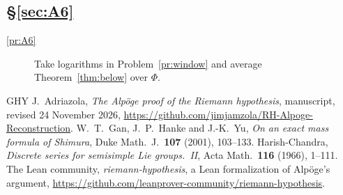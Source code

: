 \documentclass[reqno]{amsart}
\theoremstyle{definition}
\theoremstyle{plain}
\theoremstyle{remark}
\begin{document}
\subsection*{\S\ref{sec:A6}}
\begin{description}
\item[\ref{pr:A6}] Take logarithms in Problem~\ref{pr:window} and average
Theorem~\ref{thm:below} over $\Phi$.
\end{description}

\begin{thebibliography}{GHY}
J.~Adriazola, \emph{The Alp\"oge proof of the Riemann hypothesis}, manuscript, revised 24 November 2026, \url{https://github.com/jimjamzola/RH-Alpoge-Reconstruction}.
 W.~T.~Gan, J.~P.~Hanke and J.-K.~Yu, \emph{On an exact mass formula of Shimura}, Duke Math.\ J.\ \textbf{107} (2001), 103--133.
 Harish-Chandra, \emph{Discrete series for semisimple Lie groups.~II}, Acta Math.\ \textbf{116} (1966), 1--111.
 The Lean community, \emph{riemann-hypothesis}, a Lean formalization of Alp\"oge's argument, \url{https://github.com/leanprover-community/riemann-hypothesis}.
\end{thebibliography}
\end{document}
